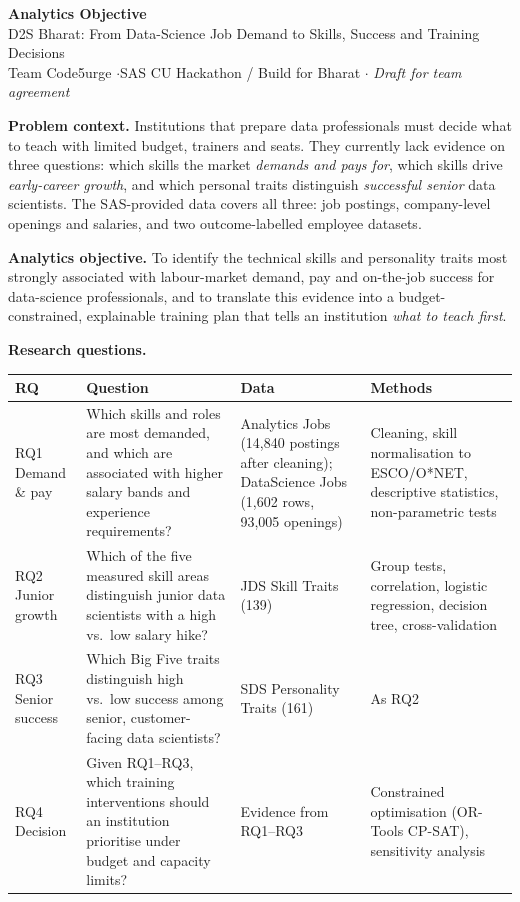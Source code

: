 \documentclass[12pt,a4paper]{article}
\begin{document}
\begin{center}
  {\Large\bfseries Analytics Objective}\\[2pt]
  {\large D2S Bharat: From Data-Science Job Demand to Skills, Success and Training Decisions}\\[4pt]
  {\small Team Code5urge \quad$\cdot$\quad SAS CU Hackathon / Build for Bharat \quad$\cdot$\quad
  \textit{Draft for team agreement}}
\end{center}

\noindent\textbf{Problem context.}
Institutions that prepare data professionals must decide what to teach with limited budget,
trainers and seats. They currently lack evidence on three questions: which skills the market
\emph{demands and pays for}, which skills drive \emph{early-career growth}, and which personal
traits distinguish \emph{successful senior} data scientists. The SAS-provided data covers all three:
job postings, company-level openings and salaries, and two outcome-labelled employee datasets.

\vspace{6pt}
\begin{objbox}
\noindent\textbf{Analytics objective.}
To identify the technical skills and personality traits most strongly associated with
labour-market demand, pay and on-the-job success for data-science professionals, and to
translate this evidence into a budget-constrained, explainable training plan that tells an
institution \emph{what to teach first}.
\end{objbox}

\vspace{4pt}
\noindent\textbf{Research questions.}\\[2pt]
{\small
\begin{tabularx}{\linewidth}{@{}L{1.9cm}Y L{3.4cm} L{3.6cm}@{}}
\toprule
\textbf{RQ} & \textbf{Question} & \textbf{Data} & \textbf{Methods} \\
\midrule
RQ1 Demand \& pay & Which skills and roles are most demanded, and which are associated with
higher salary bands and experience requirements? &
Analytics Jobs (14,840 postings after cleaning); DataScience Jobs (1,602 rows, 93,005 openings) &
Cleaning, skill normalisation to ESCO/O*NET, descriptive statistics, non-parametric tests \\
\addlinespace
RQ2 Junior growth & Which of the five measured skill areas distinguish junior data scientists
with a high vs.\ low salary hike? & JDS Skill Traits (139) &
Group tests, correlation, logistic regression, decision tree, cross-validation \\
\addlinespace
RQ3 Senior success & Which Big Five traits distinguish high vs.\ low success among senior,
customer-facing data scientists? & SDS Personality Traits (161) & As RQ2 \\
\addlinespace
RQ4 Decision & Given RQ1--RQ3, which training interventions should an institution prioritise
under budget and capacity limits? & Evidence from RQ1--RQ3 &
Constrained optimisation (OR-Tools CP-SAT), sensitivity analysis \\
\bottomrule
\end{tabularx}}
\end{document}
